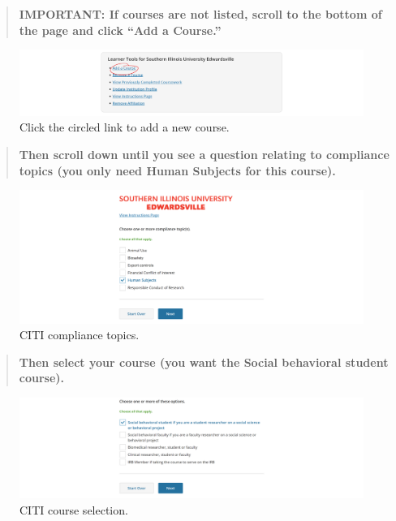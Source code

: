 \documentclass[
]{book}
\begin{document}
\begin{quote}
\textbf{IMPORTANT: If courses are not listed, scroll to the bottom of the page and click ``Add a Course.''}
\end{quote}

\begin{figure}
\centering
\includegraphics[width=1\linewidth,height=\textheight,keepaspectratio]{images/citi-add-a-course.png}
\caption{Click the circled link to add a new course.}
\end{figure}

\begin{quote}
\textbf{Then scroll down until you see a question relating to compliance topics (you only need Human Subjects for this course).}
\end{quote}

\begin{figure}
\centering
\includegraphics[width=1\linewidth,height=\textheight,keepaspectratio]{images/citi-topics.png}
\caption{CITI compliance topics.}
\end{figure}

\begin{quote}
\textbf{Then select your course (you want the Social behavioral student course).}
\end{quote}

\begin{figure}
\centering
\includegraphics[width=1\linewidth,height=\textheight,keepaspectratio]{images/citi-courses.png}
\caption{CITI course selection.}
\end{figure}
\end{document}
